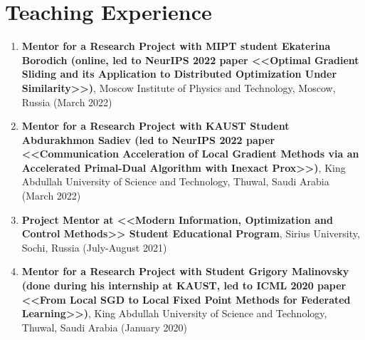 \section{Teaching Experience}

\newcommand{\teaching}[3]{{\bf #1}, #2 (#3)}

\begin{enumerate}
	
	\item \teaching{Mentor for a Research Project with MIPT student Ekaterina Borodich (online, led to NeurIPS 2022 paper <<Optimal Gradient Sliding and its Application to Distributed Optimization Under Similarity>>)}{Moscow Institute of Physics and Technology, Moscow, Russia}{March 2022}
	
	\item \teaching{Mentor for a Research Project with KAUST Student Abdurakhmon Sadiev (led to NeurIPS 2022 paper <<Communication Acceleration of Local Gradient Methods via an Accelerated Primal-Dual Algorithm with Inexact Prox>>)}{King Abdullah University of Science and Technology, Thuwal, Saudi Arabia}{March 2022}
	
	
	
	\item \teaching{Project Mentor at <<Modern Information, Optimization and Control Methods>> Student Educational Program}{Sirius University, Sochi, Russia}{July-August 2021}
	
	\item \teaching{Mentor for a Research Project with Student Grigory Malinovsky (done during his internship at KAUST, led to ICML 2020 paper <<From Local SGD to Local Fixed Point Methods for Federated Learning>>)}{King Abdullah University of Science and Technology, Thuwal, Saudi Arabia}{January 2020}
	
	
\end{enumerate}